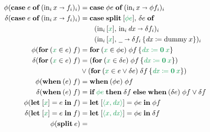 \documentclass{rntz}\usepackage[a5]{rntzgeometry}\usepackage[fullwidth=130mm,width=330pt,]{narrow}
\newcommand\mathvar[1]{\ensuremath{#1}} %
\renewcommand\mathvar[1]{\ensuremath{\mathit{#1}}} %
\newcommand\isocolor{\color{ForestGreen}} %
\newcommand\injc{\text{in}}
\newcommand\inj[1]{\injc_{#1}\,}
\newcommand\zero{\ensuremath{\mathbold{0}}}
\newcommand\<{\mskip 4mu plus 4mu minus 1mu}
\newcommand\dx{\mathvar{dx}}
\newcommand\dy{\mathvar{dy}}
\newcommand\fname\text
\newcommand\dummy{\fname{dummy}}
\newcommand\extract{{\color{Red}\fname{extract}}}
\newcommand\fnspace{\;}
\newcommand\kwname\textbf
\newcommand\efor[1]{\kwname{for}\:({#1})\fnspace}
\newcommand\ewhen[1]{\kwname{when}\:({#1})\fnspace}
\newcommand\ecase[1]{\kwname{case} \;{#1}\; \kwname{of}\;}
\newcommand\caseto\shortrightarrow
\newcommand\eif[2]{\kwname{if}\;{#1}\;\kwname{then}\;{#2}\;\kwname{else}\;}
\newcommand\ebox[1]{[{#1}]}
\newcommand\elet[1]{\kwname{let}\;#1\;\kwname{in}\;}
\newcommand\eboxd[1]{\ebox{\isocolor #1}}
\newcommand\eford[2]{\efor{{\isocolor #1} \in #2}}
\newcommand\eifd[2]{\eif{\isocolor #1}{#2}}
\newcommand\pwild{\underline{\phantom{a}}}
\newcommand\etuple[1]{\langle{#1}\rangle}
\newcommand\splitsum{\kwname{split}\<}
\newcommand\subst[2]{{#1}\,\{{#2}\}}
\newcommand\substd[2]{\subst{#1}{\isocolor #2}}
\newcommand\substo\coloneqq
\begin{document}
\begin{figure*}
  \begin{align*}
    \phi(\ecase e (\inj i x \caseto f_i)_i)
    &= \ecase{\phi e} (\inj i x \caseto \phi f_i)_i
    \\
    \delta(\ecase e (\inj i x \caseto f_i)_i)
    &= \ecase{\splitsum{\eboxd{\phi e}},\, \delta e}\\
    &\qquad ({\inj i {\eboxd x},\, \inj i \dx} \caseto \delta f_i)_i\\
    &\qquad ({\inj i {\eboxd x},\, \pwild}
      \caseto \subst{\delta f_i}{\dx \substo \dummy\<x})_i
    \\
    \phi(\eford x e f)
    &= \eford{x}{\phi e} %
    \substd{\phi f}{\dx \substo \zero\<x}
    \\
    \delta(\eford x e f)
    &= (\eford x{\delta e} \substd{\phi f}{\dx \substo \zero\<x}) \\
    &\vee (\eford x{e \vee \delta e} %
    \substd{\delta f}{\dx \substo \zero\<x})
    \\
    \phi(\ewhen e f) &= \ewhen{\phi e} \phi f
    \\
    \delta(\ewhen e f)
    &= \eifd{\phi e}{\delta f} \ewhen{\delta e} \phi f \vee \delta f
    \\
    \phi(\elet{\eboxd x = e} f) &= \elet{\eboxd{\etuple{x,\dx}} = \phi e} \phi f
    \\
    \delta(\elet{\eboxd x = e} f)
    &= \elet{\eboxd{\etuple{x,\dx}} = \phi e} \delta f
    \\
    \phi(\splitsum e) &=

\end{align*}
\end{figure*}
\end{document}
